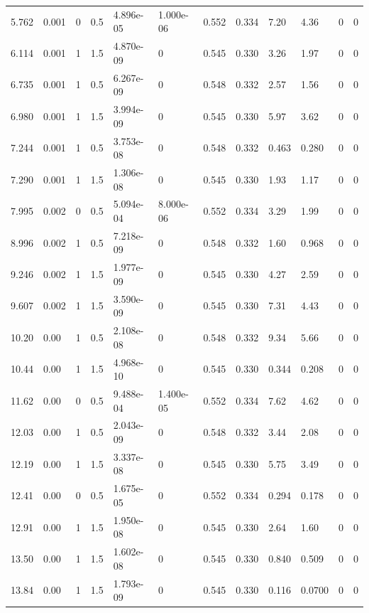 \documentclass[preview]{standalone}
\begin{document}
{{\begin{tabular}{L{1.2cm}C{1.2cm} C{0.3cm}C{0.5cm} C{1.4cm}C{1.4cm} C{1.4cm}C{1.4cm} C{1.6cm}C{1.6cm} C{1.6cm}C{1.6cm}}
  5.762  &  0.001  & 0     & 0.5 &  4.896e-05  & 1.000e-06  &  0.552&   0.334& 7.20 & 4.36   &  0 & 0  \\ 
  6.114  &  0.001  & 1     & 1.5 &  4.870e-09  & 0  &  0.545&   0.330& 3.26 & 1.97   &  0 & 0  \\ 
  6.735  &  0.001  & 1     & 0.5 &  6.267e-09  & 0  &  0.548&   0.332& 2.57 & 1.56   &  0 & 0  \\ 
  6.980  &  0.001  & 1     & 1.5 &  3.994e-09  & 0  &  0.545&   0.330& 5.97 & 3.62   &  0 & 0  \\ 
  7.244  &  0.001  & 1     & 0.5 &  3.753e-08  & 0  &  0.548&   0.332& 0.463 & 0.280   &  0 & 0  \\ 
  7.290  &  0.001  & 1     & 1.5 &  1.306e-08  & 0  &  0.545&   0.330& 1.93 & 1.17   &  0 & 0  \\ 
  7.995  &  0.002  & 0     & 0.5 &  5.094e-04  & 8.000e-06  &  0.552&   0.334& 3.29 & 1.99   &  0 & 0  \\ 
  8.996  &  0.002  & 1     & 0.5 &  7.218e-09  & 0  &  0.548&   0.332& 1.60 & 0.968   &  0 & 0  \\ 
  9.246  &  0.002  & 1     & 1.5 &  1.977e-09  & 0  &  0.545&   0.330& 4.27 & 2.59   &  0 & 0  \\ 
  9.607  &  0.002  & 1     & 1.5 &  3.590e-09  & 0  &  0.545&   0.330& 7.31 & 4.43   &  0 & 0  \\ 
  10.20  &  0.00  & 1     & 0.5 &  2.108e-08  & 0  &  0.548&   0.332& 9.34 & 5.66   &  0 & 0  \\ 
  10.44  &  0.00  & 1     & 1.5 &  4.968e-10  & 0  &  0.545&   0.330& 0.344 & 0.208   &  0 & 0  \\ 
  11.62  &  0.00  & 0     & 0.5 &  9.488e-04  & 1.400e-05  &  0.552&   0.334& 7.62 & 4.62   &  0 & 0  \\ 
  12.03  &  0.00  & 1     & 0.5 &  2.043e-09  & 0  &  0.548&   0.332& 3.44 & 2.08   &  0 & 0  \\ 
  12.19  &  0.00  & 1     & 1.5 &  3.337e-08  & 0  &  0.545&   0.330& 5.75 & 3.49   &  0 & 0  \\ 
  12.41  &  0.00  & 0     & 0.5 &  1.675e-05  & 0  &  0.552&   0.334& 0.294 & 0.178   &  0 & 0  \\ 
  12.91  &  0.00  & 1     & 1.5 &  1.950e-08  & 0  &  0.545&   0.330& 2.64 & 1.60   &  0 & 0  \\ 
  13.50  &  0.00  & 1     & 1.5 &  1.602e-08  & 0  &  0.545&   0.330& 0.840 & 0.509   &  0 & 0  \\ 
  13.84  &  0.00  & 1     & 1.5 &  1.793e-09  & 0  &  0.545&   0.330& 0.116 & 0.0700   &  0 & 0  \\ 

\end{tabular}}}
\end{document}
